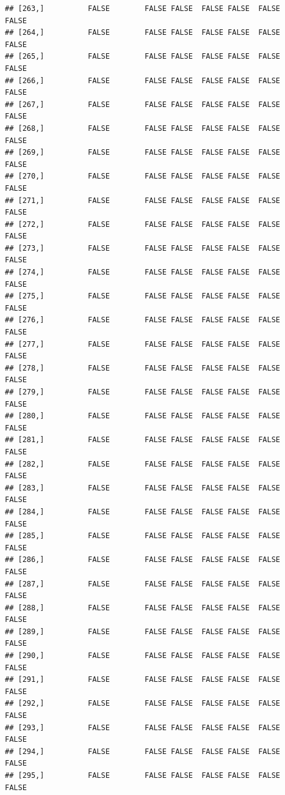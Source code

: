 \documentclass[
  english,
  man,floatsintext]{apa6}
\begin{document}
\begin{verbatim}
## [263,]          FALSE        FALSE FALSE  FALSE FALSE  FALSE            FALSE
## [264,]          FALSE        FALSE FALSE  FALSE FALSE  FALSE            FALSE
## [265,]          FALSE        FALSE FALSE  FALSE FALSE  FALSE            FALSE
## [266,]          FALSE        FALSE FALSE  FALSE FALSE  FALSE            FALSE
## [267,]          FALSE        FALSE FALSE  FALSE FALSE  FALSE            FALSE
## [268,]          FALSE        FALSE FALSE  FALSE FALSE  FALSE            FALSE
## [269,]          FALSE        FALSE FALSE  FALSE FALSE  FALSE            FALSE
## [270,]          FALSE        FALSE FALSE  FALSE FALSE  FALSE            FALSE
## [271,]          FALSE        FALSE FALSE  FALSE FALSE  FALSE            FALSE
## [272,]          FALSE        FALSE FALSE  FALSE FALSE  FALSE            FALSE
## [273,]          FALSE        FALSE FALSE  FALSE FALSE  FALSE            FALSE
## [274,]          FALSE        FALSE FALSE  FALSE FALSE  FALSE            FALSE
## [275,]          FALSE        FALSE FALSE  FALSE FALSE  FALSE            FALSE
## [276,]          FALSE        FALSE FALSE  FALSE FALSE  FALSE            FALSE
## [277,]          FALSE        FALSE FALSE  FALSE FALSE  FALSE            FALSE
## [278,]          FALSE        FALSE FALSE  FALSE FALSE  FALSE            FALSE
## [279,]          FALSE        FALSE FALSE  FALSE FALSE  FALSE            FALSE
## [280,]          FALSE        FALSE FALSE  FALSE FALSE  FALSE            FALSE
## [281,]          FALSE        FALSE FALSE  FALSE FALSE  FALSE            FALSE
## [282,]          FALSE        FALSE FALSE  FALSE FALSE  FALSE            FALSE
## [283,]          FALSE        FALSE FALSE  FALSE FALSE  FALSE            FALSE
## [284,]          FALSE        FALSE FALSE  FALSE FALSE  FALSE            FALSE
## [285,]          FALSE        FALSE FALSE  FALSE FALSE  FALSE            FALSE
## [286,]          FALSE        FALSE FALSE  FALSE FALSE  FALSE            FALSE
## [287,]          FALSE        FALSE FALSE  FALSE FALSE  FALSE            FALSE
## [288,]          FALSE        FALSE FALSE  FALSE FALSE  FALSE            FALSE
## [289,]          FALSE        FALSE FALSE  FALSE FALSE  FALSE            FALSE
## [290,]          FALSE        FALSE FALSE  FALSE FALSE  FALSE            FALSE
## [291,]          FALSE        FALSE FALSE  FALSE FALSE  FALSE            FALSE
## [292,]          FALSE        FALSE FALSE  FALSE FALSE  FALSE            FALSE
## [293,]          FALSE        FALSE FALSE  FALSE FALSE  FALSE            FALSE
## [294,]          FALSE        FALSE FALSE  FALSE FALSE  FALSE            FALSE
## [295,]          FALSE        FALSE FALSE  FALSE FALSE  FALSE            FALSE

\end{verbatim}
\end{document}
